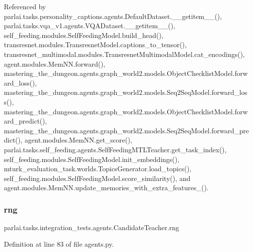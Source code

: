 Referenced by parlai.\+tasks.\+personality\+\_\+captions.\+agents.\+Default\+Dataset.\+\_\+\+\_\+getitem\+\_\+\+\_\+(), parlai.\+tasks.\+vqa\+\_\+v1.\+agents.\+V\+Q\+A\+Dataset.\+\_\+\+\_\+getitem\+\_\+\+\_\+(), self\+\_\+feeding.\+modules.\+Self\+Feeding\+Model.\+build\+\_\+head(), transresnet.\+modules.\+Transresnet\+Model.\+captions\+\_\+to\+\_\+tensor(), transresnet\+\_\+multimodal.\+modules.\+Transresnet\+Multimodal\+Model.\+cat\+\_\+encodings(), agent.\+modules.\+Mem\+N\+N.\+forward(), mastering\+\_\+the\+\_\+dungeon.\+agents.\+graph\+\_\+world2.\+models.\+Object\+Checklist\+Model.\+forward\+\_\+loss(), mastering\+\_\+the\+\_\+dungeon.\+agents.\+graph\+\_\+world2.\+models.\+Seq2\+Seq\+Model.\+forward\+\_\+loss(), mastering\+\_\+the\+\_\+dungeon.\+agents.\+graph\+\_\+world2.\+models.\+Object\+Checklist\+Model.\+forward\+\_\+predict(), mastering\+\_\+the\+\_\+dungeon.\+agents.\+graph\+\_\+world2.\+models.\+Seq2\+Seq\+Model.\+forward\+\_\+predict(), agent.\+modules.\+Mem\+N\+N.\+get\+\_\+score(), parlai.\+tasks.\+self\+\_\+feeding.\+agents.\+Self\+Feeding\+M\+T\+L\+Teacher.\+get\+\_\+task\+\_\+index(), self\+\_\+feeding.\+modules.\+Self\+Feeding\+Model.\+init\+\_\+embeddings(), mturk\+\_\+evaluation\+\_\+task.\+worlds.\+Topics\+Generator.\+load\+\_\+topics(), self\+\_\+feeding.\+modules.\+Self\+Feeding\+Model.\+score\+\_\+similarity(), and agent.\+modules.\+Mem\+N\+N.\+update\+\_\+memories\+\_\+with\+\_\+extra\+\_\+features\+\_\+().

\mbox{\label{classparlai_1_1tasks_1_1integration__tests_1_1agents_1_1CandidateTeacher_a5a3546d63a560078f70db21db4e28892}} 
\subsubsection{\texorpdfstring{rng}{rng}}
{\footnotesize\ttfamily parlai.\+tasks.\+integration\+\_\+tests.\+agents.\+Candidate\+Teacher.\+rng}



Definition at line 83 of file agents.\+py.

\mbox{\label{classparlai_1_1tasks_1_1integration__tests_1_1agents_1_1CandidateTeacher_abafce10a603b03f5a821b5a5b79985df}} 
